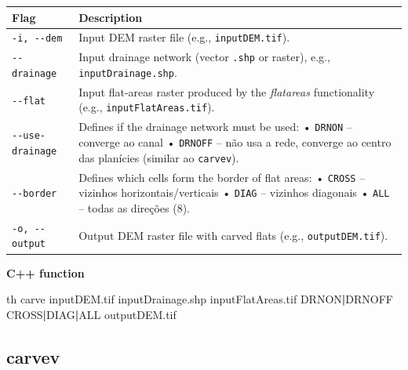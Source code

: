 \documentclass[
]{book}
\newenvironment{Shaded}{\begin{snugshade}}{\end{snugshade}}
\newcommand{\ExtensionTok}[1]{#1}
\newcommand{\KeywordTok}[1]{\textcolor[rgb]{0.13,0.29,0.53}{\textbf{#1}}}
\newcommand{\NormalTok}[1]{#1}
\theoremstyle{definition}
\theoremstyle{definition}
\theoremstyle{definition}
\theoremstyle{definition}
\theoremstyle{remark}
\begin{document}
\begin{longtable}[]{@{}
  >{\raggedright\arraybackslash}p{}
  >{\raggedright\arraybackslash}p{}@{}}
\toprule\noalign{}
\begin{minipage}[b]{\linewidth}\raggedright
Flag
\end{minipage} & \begin{minipage}[b]{\linewidth}\raggedright
Description
\end{minipage} \\
\midrule\noalign{}
\endhead
\bottomrule\noalign{}
\endlastfoot
\texttt{-i,\ -\/-dem} & Input DEM raster file (e.g., \texttt{inputDEM.tif}). \\
\texttt{-\/-drainage} & Input drainage network (vector \texttt{.shp} or raster), e.g., \texttt{inputDrainage.shp}. \\
\texttt{-\/-flat} & Input flat-areas raster produced by the \emph{flatareas} functionality (e.g., \texttt{inputFlatAreas.tif}). \\
\texttt{-\/-use-drainage} & Defines if the drainage network must be used: • \texttt{DRNON} -- converge ao canal • \texttt{DRNOFF} -- não usa a rede, converge ao centro das planícies (similar ao \texttt{carvev}). \\
\texttt{-\/-border} & Defines which cells form the border of flat areas: • \texttt{CROSS} -- vizinhos horizontais/verticais • \texttt{DIAG} -- vizinhos diagonais • \texttt{ALL} -- todas as direções (8). \\
\texttt{-o,\ -\/-output} & Output DEM raster file with carved flats (e.g., \texttt{outputDEM.tif}). \\
\end{longtable}

\textbf{C++ function}

\begin{Shaded}
\begin{Highlighting}[]
\ExtensionTok{th}\NormalTok{ carve inputDEM.tif inputDrainage.shp inputFlatAreas.tif DRNON}\KeywordTok{|}\ExtensionTok{DRNOFF}\NormalTok{ CROSS}\KeywordTok{|}\ExtensionTok{DIAG}\KeywordTok{|}\ExtensionTok{ALL}\NormalTok{ outputDEM.tif}
\end{Highlighting}
\end{Shaded}

\subsection{carvev}\label{carvev}
\end{document}
